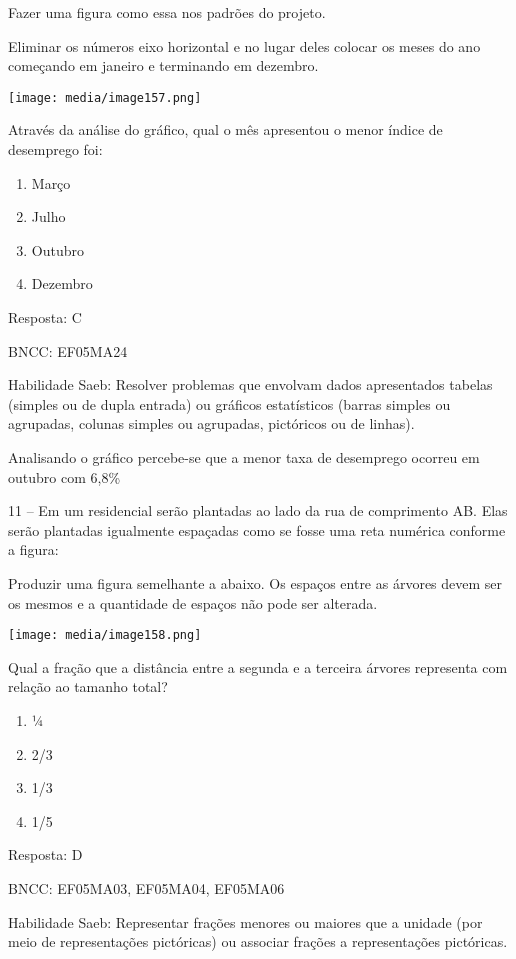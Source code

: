 Fazer uma figura como essa nos padrões do projeto.

Eliminar os números eixo horizontal e no lugar deles colocar os meses do
ano começando em janeiro e terminando em dezembro.

\texttt{[image: media/image157.png]}

Através da análise do gráfico, qual o mês apresentou o menor índice de
desemprego foi:

\begin{enumerate}
\def\labelenumi{\alph{enumi})}
\item
  Março
\item
  Julho
\item
  Outubro
\item
  Dezembro
\end{enumerate}

Resposta: C

BNCC: EF05MA24

Habilidade Saeb: Resolver problemas que envolvam dados apresentados
tabelas (simples ou de dupla entrada) ou gráficos estatísticos (barras
simples ou agrupadas, colunas simples ou agrupadas, pictóricos ou de
linhas).

Analisando o gráfico percebe-se que a menor taxa de desemprego ocorreu
em outubro com 6,8\%

11 -- Em um residencial serão plantadas ao lado da rua de comprimento
AB. Elas serão plantadas igualmente espaçadas como se fosse uma reta
numérica conforme a figura:

Produzir uma figura semelhante a abaixo. Os espaços entre as árvores
devem ser os mesmos e a quantidade de espaços não pode ser alterada.

\texttt{[image: media/image158.png]}

Qual a fração que a distância entre a segunda e a terceira árvores
representa com relação ao tamanho total?

\begin{enumerate}
\def\labelenumi{\alph{enumi})}
\item
  ¼
\item
  2/3
\item
  1/3
\item
  1/5
\end{enumerate}

Resposta: D

BNCC: EF05MA03, EF05MA04, EF05MA06

Habilidade Saeb: Representar frações menores ou maiores que a unidade
(por meio de representações pictóricas) ou associar frações a
representações pictóricas.

